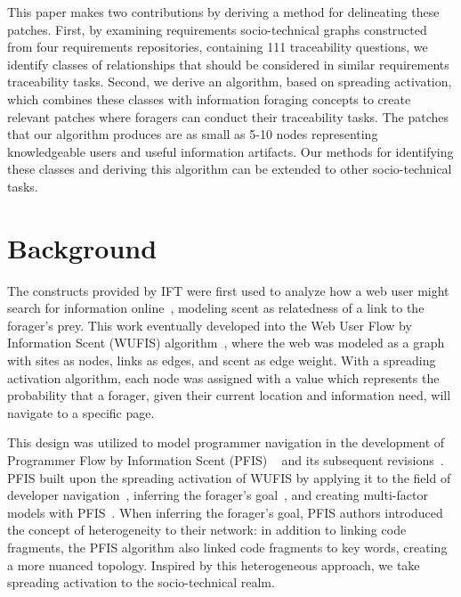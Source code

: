 \documentclass[conference]{IEEEtran}
\begin{document}
This paper makes two contributions by deriving a method for delineating these patches. First, by examining requirements socio-technical graphs constructed from four requirements repositories, containing 111 traceability questions, we identify classes of relationships that should be considered in similar requirements traceability tasks. Second, we derive an algorithm, based on spreading activation, which combines these classes with information foraging concepts to create relevant patches where foragers can conduct their traceability tasks. The patches that our algorithm produces are as small as 5-10 nodes representing knowledgeable users and useful information artifacts. Our methods for identifying these classes and deriving this algorithm can be extended to other socio-technical tasks.

\section{Background}

The constructs provided by IFT were first used to analyze how a web user might search for information online~\cite{pirolliWeb}, modeling scent as relatedness of a link to the forager's prey. This work eventually developed into the Web User Flow by Information Scent (WUFIS) algorithm~\cite{wufis}, where the web was modeled as a graph with sites as nodes, links as edges, and scent as edge weight. With a spreading activation algorithm, each node was assigned with a value which represents the probability that a forager, given their current location and information need, will navigate to a specific page.

This design was utilized to model programmer navigation in the development of Programmer Flow by Information Scent (PFIS) ~\cite{pfis1a} and its subsequent revisions~\cite{pfis2,pfis3a}. PFIS built upon the spreading activation of WUFIS by applying it to the field of developer navigation~\cite{pfis1a}, inferring the forager's goal~\cite{pfis2}, and creating multi-factor models with PFIS~\cite{pfis3a}. When inferring the forager's goal, PFIS authors introduced the concept of heterogeneity to their network: in addition to linking code fragments, the PFIS algorithm also linked code fragments to key words, creating a more nuanced topology. Inspired by this heterogeneous approach, we take spreading activation to the socio-technical realm.
\end{document}
